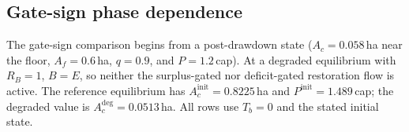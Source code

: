 \begin{table}[htbp]
\centering\small
\caption{Recovery of the capital-land area after a demand-driven drawdown ($A_{c0}=1.0$\,ha, $A_{f0}=0.6$\,ha, $q_0=0.9$, $T=400$\,yr): initial population $P_0$ is in cap, initial footprint $E_0$ in gha, capital-land values in ha, and the recovery metric is dimensionless.}
\label{tab:si_recovery}

\end{table}

\subsection{Gate-sign phase dependence}\label{si:gates}

The gate-sign comparison begins from a post-drawdown state ($A_c=0.058$\,ha near the floor, $A_f=0.6$\,ha, $q=0.9$, and $P=1.2$\,cap). At a degraded equilibrium with $R_B=1$, $B=E$, so neither the surplus-gated nor deficit-gated restoration flow is active. The reference equilibrium has $A_c^{\mathrm{init}}=0.8225$\,ha and $P^{\mathrm{init}}=1.489$\,cap; the degraded value is $A_c^{\mathrm{deg}}=0.0513$\,ha. All rows use $T_b=0$ and the stated initial state.

